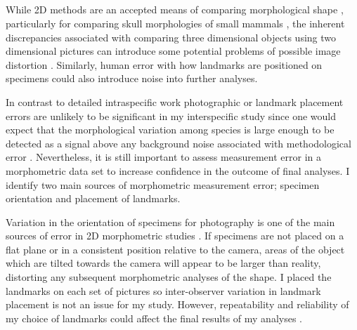 \subsection{}

	 
	While 2D methods are an accepted means of comparing morphological shape \citep[e.g.][]{Adams2004, Mitteroecker2009}, particularly for comparing skull morphologies of small mammals \citep[e.g.][]{Cardini2003, Panchetti2008, White2008, Barrow2008, Scalici2011}, the inherent discrepancies associated with comparing three dimensional objects using two dimensional pictures can introduce some potential problems of possible image distortion \citep{Arnqvist1998}. Similarly, human error with how landmarks are positioned on specimens could also introduce noise into further analyses. 
	
	In contrast to detailed intraspecific work \citep[e.g.][]{Bornholdt2008, Blagojevic2011} photographic or landmark placement errors are unlikely to be significant in my interspecific study since one would expect that the morphological variation among species is large enough to  be detected as a signal above any background noise associated with methodological error \citep{Arnqvist1998}. Nevertheless, it is still important to assess measurement error in a morphometric data set to increase confidence in the outcome of final analyses.
	I identify two main sources of morphometric measurement error; specimen orientation and placement of landmarks.

	Variation in the orientation of specimens for photography is one of the main sources of error in 2D morphometric studies \citep{Adriaens2007}. If specimens are not placed on a flat plane or in a consistent position relative to the camera, areas of the object which are tilted towards the camera will appear to be larger than reality, distorting any subsequent morphometric analyses of the shape. 
	I placed the landmarks on each set of pictures so inter-observer variation in landmark placement is not an issue for my study.  However, repeatability and reliability of my choice of landmarks could affect the final results of my analyses \citep{Arnqvist1998}.

